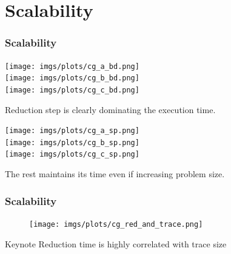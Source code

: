 \documentclass{beamer}
\begin{document}
\section{Scalability}
\begin{frame}
\frametitle{Scalability}
\begin{multicols}{2}
	\texttt{[image: imgs/plots/cg\_a\_bd.png]}\\
	\texttt{[image: imgs/plots/cg\_b\_bd.png]}\\
	\texttt{[image: imgs/plots/cg\_c\_bd.png]}\\
	\vfill
	\pause
	\begin{mdframed}[backgroundcolor=black!10,roundcorner=5pt,linewidth=0pt]
		Reduction step is clearly dominating the execution time.
	\end{mdframed}
	\pause
	\columnbreak
	\centering
	\texttt{[image: imgs/plots/cg\_a\_sp.png]}\\
	\texttt{[image: imgs/plots/cg\_b\_sp.png]}\\
	\texttt{[image: imgs/plots/cg\_c\_sp.png]}\\
	\vfill
	\pause
	\begin{mdframed}[backgroundcolor=black!10,roundcorner=5pt,linewidth=0pt]
		The rest maintains its time even if increasing problem size.
	\end{mdframed}
\end{multicols}
\end{frame}

\begin{frame}
\frametitle{Scalability}
\begin{figure}
\texttt{[image: imgs/plots/cg\_red\_and\_trace.png]}
\end{figure}
\begin{block}{Keynote}
Reduction time is highly correlated with trace size
\end{block}
\end{frame}

%
%
\end{document}
